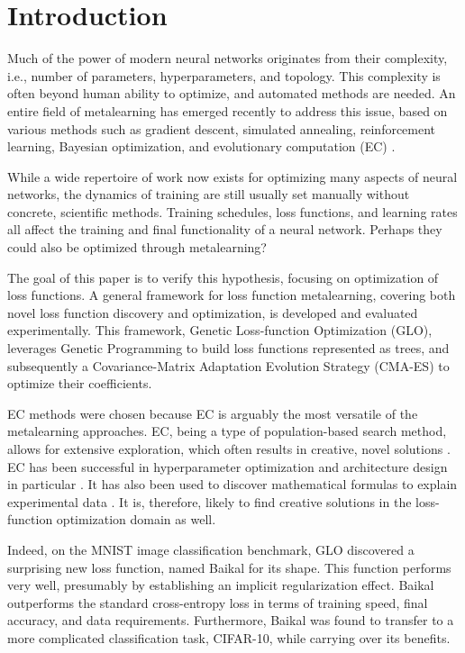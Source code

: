 \documentclass[conference]{IEEEtran}
\newcommand{\TECH}{GLO\xspace}
\begin{document}
\section{Introduction}

Much of the power of modern neural networks originates from their
complexity, i.e., number of parameters, hyperparameters, and topology.
This complexity is often beyond human ability to optimize, and automated
methods are needed. An entire field of metalearning has emerged
recently to address this issue, based on various methods such as
gradient descent, simulated annealing, reinforcement learning, Bayesian optimization, and
evolutionary computation (EC) \cite{elsken2019neural}.

While a wide repertoire of work now exists for optimizing many aspects
of neural networks, the dynamics of training are still usually set
manually without concrete, scientific methods. Training schedules,
loss functions, and learning rates all affect the training and final
functionality of a neural network. Perhaps they could
also be optimized through metalearning?

The goal of this paper is to verify this hypothesis, focusing on
optimization of loss functions. A general framework for loss function
metalearning, covering both novel loss function discovery and
optimization, is developed and evaluated experimentally. This
framework, Genetic Loss-function Optimization (\TECH), leverages Genetic
Programming to build loss functions represented as trees, and
subsequently a Covariance-Matrix Adaptation Evolution Strategy (CMA-ES)
to optimize their coefficients.

EC methods were chosen because EC is arguably the most versatile of
the metalearning approaches. EC, being a type of population-based search method, allows for extensive exploration, which often results in creative,
novel solutions \cite{lehman2018surprising}. EC has been
successful in hyperparameter optimization and architecture design in
particular \cite{miikkulainen2019evolving, nature_neuroevolution, real2019regularized, loshchilov2016cma}. It has also been used to
discover mathematical formulas to explain experimental data \cite{schmidt2009distilling}. It is, therefore, likely to find creative solutions in
the loss-function optimization domain as well.

Indeed, on the MNIST image classification benchmark, GLO discovered a
surprising new loss function, named Baikal for its shape. This
function performs very well, presumably by establishing an implicit
regularization effect. Baikal outperforms the standard cross-entropy
loss in terms of training speed, final accuracy, and data
requirements. Furthermore, Baikal was found to transfer to a more
complicated classification task, CIFAR-10, while carrying over its
benefits.
\end{document}
